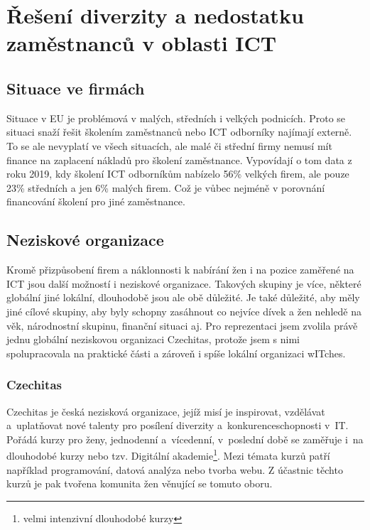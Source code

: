\documentclass[12pt]{report}			%
\begin{document}
    \chapter {Řešení diverzity a nedostatku zaměstnanců v oblasti ICT}
    	
    	    \section{Situace ve firmách}
             Situace v EU je problémová v malých, středních i velkých podnicích. Proto se situaci snaží řešit školením zaměstnanců nebo ICT odborníky najímají externě. To se ale nevyplatí ve všech situacích, ale malé či střední firmy nemusí mít finance na zaplacení nákladů pro školení zaměstnance. Vypovídají o tom data z roku 2019, kdy školení ICT odborníkům nabízelo 56\% velkých firem, ale pouze 23\% středních a jen 6\% malých firem. Což je vůbec nejméně v porovnání financování školení pro jiné zaměstnance.\cite{EmploymentOfICTSpecialists}
             
        \section {Neziskové organizace}
            Kromě přizpůsobení firem a náklonnosti k nabírání žen i na pozice zaměřené na ICT jsou další možností i neziskové organizace. Takových skupiny je více, některé globální jiné lokální, dlouhodobě jsou ale obě důležité. Je také důležité, aby měly jiné cílové skupiny, aby byly schopny zasáhnout co nejvíce dívek a žen nehledě na věk, národnostní skupinu, finanční situaci aj. Pro reprezentaci jsem zvolila právě jednu globální neziskovou organizaci Czechitas, protože jsem s nimi spolupracovala na praktické části a zároveň i spíše lokální organizaci wITches.
            
            \subsection {Czechitas}

                Czechitas je česká nezisková organizace, jejíž misí je inspirovat, vzdělávat a~uplatňovat nové talenty pro posílení diverzity a~konkurenceschopnosti v~IT. Pořádá kurzy pro ženy, jednodenní a~vícedenní, v~poslední době se zaměřuje i~na dlouhodobé kurzy nebo tzv. Digitální akademie\footnote{velmi intenzivní dlouhodobé kurzy}. Mezi témata kurzů patří například programování, datová analýza nebo tvorba webu. Z účastnic těchto kurzů je pak tvořena komunita žen věnující se tomuto oboru.\cite{CzechitasCoDelame} 
\end{document}
